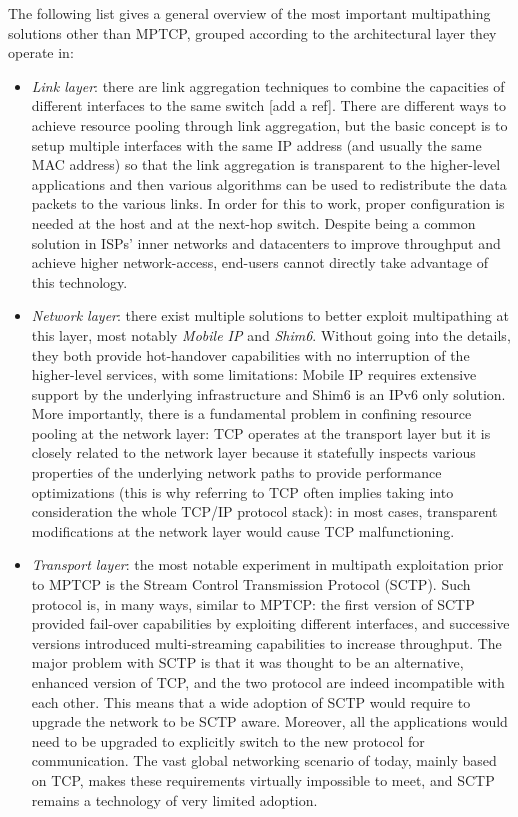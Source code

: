 The following list gives a general overview of the most important multipathing solutions other than MPTCP, grouped according to the architectural layer they operate in:
\begin{itemize}
  \item \textit{Link layer}: there are link aggregation techniques to combine the capacities of different interfaces to the same switch [add a ref]. There are different ways to achieve resource pooling through link aggregation, but the basic concept is to setup multiple interfaces with the same IP address (and usually the same MAC address) so that the link aggregation is transparent to the higher-level applications and then various algorithms can be used to redistribute the data packets to the various links. In order for this to work, proper configuration is needed at the host and at the next-hop switch. Despite being a common solution in ISPs' inner networks and datacenters to improve throughput and achieve higher network-access, end-users cannot directly take advantage of this technology.


  \item \textit{Network layer}: there exist multiple solutions to better exploit multipathing at this layer, most notably \textit{Mobile IP} and \textit{Shim6}. Without going into the details, they both provide hot-handover capabilities with no interruption of the higher-level services, with some limitations: Mobile IP requires extensive support by the underlying infrastructure and Shim6 is an IPv6 only solution. More importantly, there is a fundamental problem in confining resource pooling at the network layer: TCP operates at the transport layer but it is closely related to the network layer because it statefully inspects various properties of the underlying network paths to provide performance optimizations (this is why referring to TCP often implies taking into consideration the whole TCP/IP protocol stack): in most cases, transparent modifications at the network layer would cause TCP malfunctioning.


  \item \textit{Transport layer}: the most notable experiment in multipath exploitation prior to MPTCP is the Stream Control Transmission Protocol (SCTP). Such protocol is, in many ways, similar to MPTCP: the first version of SCTP provided fail-over capabilities by exploiting different interfaces, and successive versions introduced multi-streaming capabilities to increase throughput. The major problem with SCTP is that it was thought to be an alternative, enhanced version of TCP, and the two protocol are indeed incompatible with each other. This means that a wide adoption of SCTP would require to upgrade the network to be SCTP aware. Moreover, all the applications would need to be upgraded to explicitly switch to the new protocol for communication. The vast global networking scenario of today, mainly based on TCP, makes these requirements virtually impossible to meet, and SCTP remains a technology of very limited adoption.
\end{itemize}




